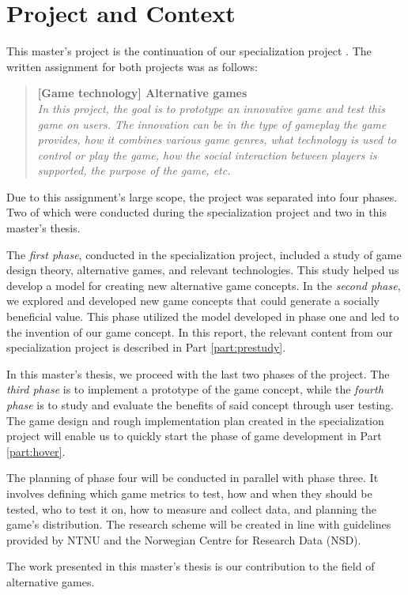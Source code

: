 \section{Project and Context}
\label{chap:project_context}

This master’s project is the continuation of our specialization project \citep{mykland_exploring_2020}. The written assignment for both projects was as follows:

\blockquote{
    \textbf{[Game technology] Alternative games} \\
    \textit{In this project, the goal is to prototype an innovative game and test this game on users. The innovation can be in the type of gameplay the game provides, how it combines various game genres, what technology is used to control or play the game, how the social interaction between players is supported, the purpose of the game, etc.}
}

Due to this assignment’s large scope, the project was separated into four phases. Two of which were conducted during the specialization project and two in this master’s thesis.

The \textit{first phase}, conducted in the specialization project, included a study of game design theory, alternative games, and relevant technologies. This study helped us develop a model for creating new alternative game concepts. In the \textit{second phase}, we explored and developed new game concepts that could generate a socially beneficial value. This phase utilized the model developed in phase one and led to the invention of our game concept. In this report, the relevant content from our specialization project is described in Part \ref{part:prestudy}. 

In this master’s thesis, we proceed with the last two phases of the project. The \textit{third phase} is to implement a prototype of the game concept, while the \textit{fourth phase} is to study and evaluate the benefits of said concept through user testing. The game design and rough implementation plan created in the specialization project will enable us to quickly start the phase of game development in Part \ref{part:hover}. 

The planning of phase four will be conducted in parallel with phase three. It involves defining which game metrics to test, how and when they should be tested, who to test it on, how to measure and collect data, and planning the game’s distribution. The research scheme will be created in line with guidelines provided by NTNU and the Norwegian Centre for Research Data (NSD).

The work presented in this master’s thesis is our contribution to the field of alternative games.

